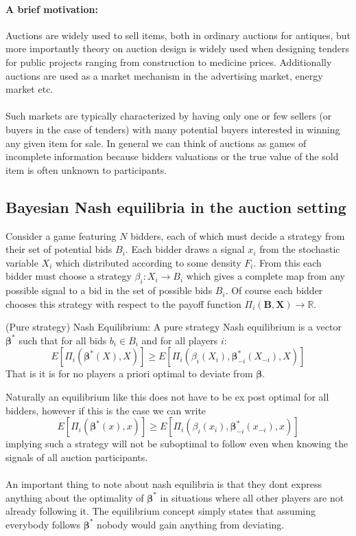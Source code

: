\paragraph{A brief motivation:} Auctions are widely used to sell items, both in ordinary auctions for antiques, but more importantly theory on auction design is widely used when designing tenders for public projects ranging from construction to medicine prices. Additionally auctions are used as a market mechanism in the advertising market, energy market etc.
\\ \\
Such markets are typically characterized by having only one or few sellers (or buyers in the case of tenders) with many potential buyers interested in winning any given item for sale. In general we can think of auctions as games of incomplete information because bidders valuations or the true value of the sold item is often unknown to participants.

\subsection{Bayesian Nash equilibria in the auction setting}
Consider a game featuring $N$ bidders, each of which must decide a strategy from their set of potential bids $B_i$. Each bidder draws a signal $x_i$ from the stochastic variable $X_i$ which distributed according to some density $F_i$. From this each bidder must choose a strategy $\beta_i: X_i \rightarrow B_i$ which gives a complete map from any possible signal to a bid in the set of possible bids $B_i$. Of course each bidder chooses this strategy with respect to the payoff function $\Pi_i(\bm B, \bm X) \rightarrow \mathbb{R}$.


\begin{definition}{(Pure strategy) Nash Equilibrium:}
  A pure strategy Nash equilibrium is a vector $\bm\beta^*$ such that for all bids $b_i \in B_i$ and for all players $i$:
  \begin{equation}
    E[\Pi_i(\bm\beta^*(X), X)] \geq E[\Pi_i(\beta_i(X_i), \bm\beta^*_{-i}(X_{-i}),X )]
  \end{equation}
  That is it is for no players a priori optimal to deviate from $\bm\beta$.
\end{definition}

Naturally an equilibrium like this does not have to be ex post optimal for all bidders, however if this is the case we can write
\begin{equation}
      E[\Pi_i(\bm\beta^*(x), x)] \geq E[\Pi_i(\beta_i(x_i), \bm\beta^*_{-i}(x_{-i}),x )]
\end{equation}
implying such a strategy will not be suboptimal to follow even when knowing the signals of all auction participants.
\\ \\
An important thing to note about nash equilibria is that they dont express anything about the optimality of $\bm\beta^*$ in situations where all other players are not already following it. The equilibrium concept simply states that assuming everybody follows $\bm\beta^*$ nobody would gain anything from deviating.

